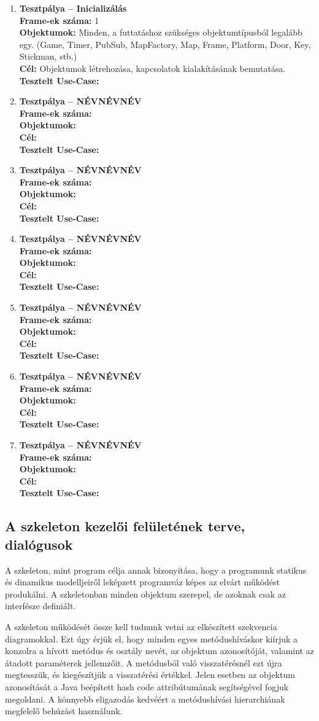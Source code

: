 		\begin{enumerate}[label=\textbf{\arabic*.}, start=0]
		
			\newcommand{\testitem}[1]{\item \textbf{Tesztpálya -- #1}\\}
			\newcommand{\tframe}[1]{\textbf{Frame-ek száma:} #1\\}
			\newcommand{\tobjekt}[1]{\textbf{Objektumok:} #1\\}
			\newcommand{\tcel}[1]{\textbf{Cél:} #1\\}
			\newcommand{\tuse}[1]{\textbf{Tesztelt Use-Case:} #1\\}
		
			\testitem{Inicializálás}
				\tframe{1}
				\tobjekt{Minden, a futtatáshoz szükséges objektumtípusból legalább egy.
					(Game, Timer, PubSub, MapFactory, Map, Frame, Platform, Door, Key, Stickman, stb.)}
				\tcel{Objektumok létrehozása, kapcsolatok kialakításának bemutatása.}
				\tuse{} 
			\testitem{NÉVNÉVNÉV}
				\tframe{}
				\tobjekt{}
				\tcel{} 
				\tuse{}
			\testitem{NÉVNÉVNÉV}
				\tframe{}
				\tobjekt{}
				\tcel{} 
				\tuse{}
			\testitem{NÉVNÉVNÉV}
				\tframe{}
				\tobjekt{}
				\tcel{} 
				\tuse{}
			\testitem{NÉVNÉVNÉV}
				\tframe{}
				\tobjekt{}
				\tcel{} 
				\tuse{}
			\testitem{NÉVNÉVNÉV}
				\tframe{}
				\tobjekt{}
				\tcel{} 
				\tuse{}
			\testitem{NÉVNÉVNÉV}
				\tframe{}
				\tobjekt{}
				\tcel{} 
				\tuse{} 
		\end{enumerate}
	
	\subsection{A szkeleton kezelői felületének terve, dialógusok}
		A szkeleton, mint program célja annak bizonyítása, hogy a programunk statikus és dinamikus modelljeiről leképzett programváz képes az elvárt működést produkálni. A szkeletonban minden objektum szerepel, de azoknak csak az interfésze definiált.
		
		A szkeleton működését össze kell tudnunk vetni az elkészített szekvencia diagramokkal. Ezt úgy érjük el, hogy minden egyes metódushíváskor kiírjuk a konzolra a hívott metódus és osztály nevét, az objektum azonosítóját, valamint az átadott paraméterek jellemzőit. A metódusból való visszatérésnél ezt újra megtesszük, és kiegészítjük a visszatérési értékkel. Jelen esetben az objektum azonosítását a Java beépített hash code attribútumának segítségével fogjuk megoldani. A könnyebb eligazodás kedvéért a metódushívási hierarchiának megfelelő behúzást használunk.
		
